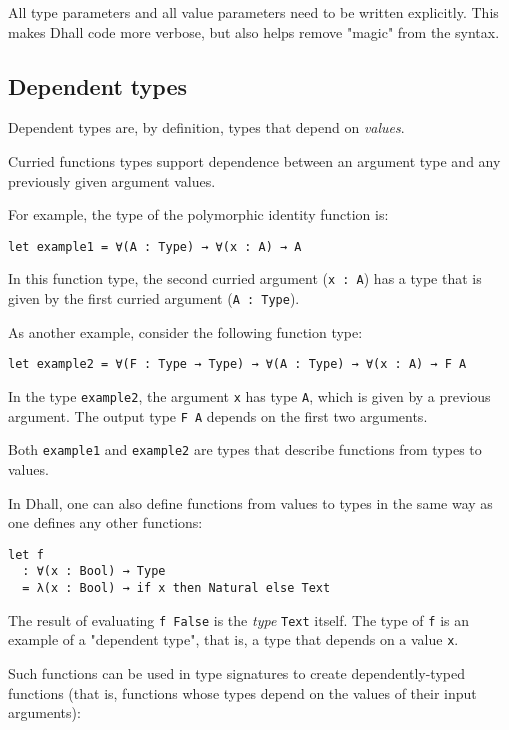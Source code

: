 All type parameters and all value parameters need to be written explicitly.
This makes Dhall code more verbose, but also helps remove "magic" from the syntax.


\subsection{Dependent types}


Dependent types are, by definition, types that depend on \emph{values}.


Curried functions types support dependence between an argument type and any previously given argument values.


For example, the type of the polymorphic identity function is:


\begin{lstlisting}[language=Dhall]
let example1 = ∀(A : Type) → ∀(x : A) → A
\end{lstlisting}


In this function type, the second curried argument (\lstinline!x : A!) has a type that is given by the first curried argument (\lstinline!A : Type!).


As another example, consider the following function type:


\begin{lstlisting}[language=Dhall]
let example2 = ∀(F : Type → Type) → ∀(A : Type) → ∀(x : A) → F A
\end{lstlisting}


In the type \lstinline!example2!, the argument \lstinline!x! has type \lstinline!A!, which is given by a previous argument.
The output type \lstinline!F A! depends on the first two arguments.


Both \lstinline!example1! and \lstinline!example2! are types that describe functions from types to values.


In Dhall, one can also define functions from values to types in the same way as one defines any other functions:


\begin{lstlisting}[language=Dhall]
let f
  : ∀(x : Bool) → Type
  = λ(x : Bool) → if x then Natural else Text 
\end{lstlisting}


The result of evaluating \lstinline!f False! is the \emph{type} \lstinline!Text! itself.
The type of \lstinline!f! is an example of a "dependent type", that is, a type that depends on a value \lstinline!x!.


Such functions can be used in type signatures to create dependently-typed functions (that is, functions whose types depend on the values of their input arguments):


